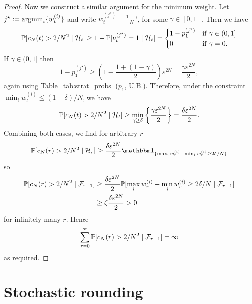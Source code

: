 \begin{proof}
Now we construct a similar argument for the minimum weight. Let $j^\star := \operatorname*{argmin}_i \{ w_t^{(i)} \}$ and write
$w_t^{(j^\star)} = \frac{1-\gamma}{N}$, for some $\gamma \in [0,1]$.
Then we have
\begin{equation*}
\mathbb{P}[ c_N(t) > 2/N^2 \mid \mathcal{H}_t ]
\geq 1- \mathbb{P}[ \nu_t^{(j^\star)} =1 \mid \mathcal{H}_t ]
=\begin{cases}
    1- p_1^{(j^\star)} & \text{if } \gamma \in (0,1] \\
    0 & \text{if } \gamma =0 .
\end{cases}
\end{equation*}
If $\gamma \in (0,1]$ then
\begin{equation*}
1- p_1^{(j^\star)}
\geq \left( 1- \frac{1+ (1-\gamma)}{2} \right) \varepsilon^{2N}
= \frac{ \gamma \varepsilon^{2N} }{2} ,
\end{equation*}
again using Table~\ref{tab:strat_probs} ($p_1$, U.B.).
Therefore, under the constraint $\min_i w_t^{(i)} \leq (1-\delta)/N$, we have
\begin{equation*}
\mathbb{P}[ c_N(t) > 2/N^2 \mid \mathcal{H}_t ]
\geq \min_{\gamma \geq \delta} 
        \left\{ \frac{ \gamma \varepsilon^{2N} }{2} 
        \right\}
= \frac{ \delta \varepsilon^{2N} }{2} .
\end{equation*}
Combining both cases, we find for arbitrary $r$
\begin{equation*}
\Prob[ c_N(r) > 2/N^2 \mid \mathcal{H}_r ] 
\geq  \frac{ \delta \varepsilon^{2N} }{2}
        \I{ \max_i w_r^{(i)} - \min_i w_r^{(i)} \geq 2\delta/N }
\end{equation*}
so
\begin{align*}
\mathbb{P}[ c_N(r) > 2/N^2 \mid \mathcal{F}_{r-1} ] 
&\geq  \frac{ \delta \varepsilon^{2N} }{2}
        \mathbb{P}[ \max_i w_r^{(i)} - \min_i w_r^{(i)} \geq 2\delta/N 
        \mid \mathcal{F}_{r-1} ] \\
&\geq \zeta \frac{ \delta \varepsilon^{2N} }{2}
> 0
\end{align*}
for infinitely many $r$.
Hence
\begin{equation*}
\sum_{r=0}^\infty \mathbb{P}[ c_N(r) > 2/N^2  \mid \mathcal{F}_{r-1} ] = \infty
\end{equation*}
as required.
\end{proof}



\section{Stochastic rounding \seb{$\checkmark$} }

